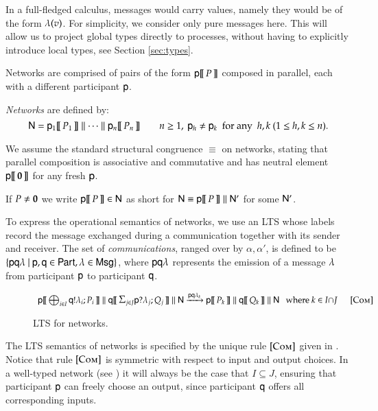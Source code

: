  
In a full-fledged calculus, messages would carry values, 
namely they would be of the form $\lambda(v)$.  For simplicity, we
consider only pure messages here. This will allow us to project global
types directly to processes,  without having to explicitly introduce local
types,  see Section \ref{sec:types}.

\bigskip

Networks are comprised of 
pairs of the form
${\sf p}[\![\,P\,]\!]$ composed in parallel, each with a
different participant ${\sf p}$. 
\begin{definition}[Networks]
{\em Networks} are defined by:
\[
\Nt = \pP{\pp_1}{\PP_1} \parN \cdots \parN \pP{\pp_n}{\PP_n}  \qquad
 n\geq 1,  \ 
\pp_h \neq \pp_k ~~\text{for any}~~ h, k~(1\leq h,k\leq n).
\]
\end{definition}
We assume the standard structural congruence  $\equiv$  on
networks, stating that parallel composition is associative and
commutative and has neutral element ${\sf p}[\![\,\mathbf{0}\,]\!]$ for any fresh
${\sf p}$.

If $P\neq\mathbf{0}$ we write ${\sf p}[\![\,P\,]\!]\in{\sf N}$ as short for
${\sf N}\equiv{\sf p}[\![\,P\,]\!]\mathrel{\|}{\sf N}'$ for some ${\sf N}'$.  



To express the operational semantics of networks, we use an LTS whose
labels record the message exchanged during a communication together
with its sender and receiver.  The set of \emph{communications},
ranged over by $\alpha, \alpha'$, is defined to be $\{
{\sf p}{\sf q}\lambda ~|~ {\sf p},{\sf q}\in {\sf Part}, \lambda \in {\sf Msg}\}$,
where ${\sf p}{\sf q}\lambda$ represents the emission of a message $\lambda$
from participant ${\sf p}$ to participant
${\sf q}$.  %

\begin{figure}[h]
{\small
\[
\begin{array}{c}
\pP{\pp}{\oup\q{i}{I}{\la}{\PP}}\parN \pP{\q}{\inp\pp{j}{J}{\la}{\Q}}\parN\Nt\stackred{\Comm\pp{\la_k}\q}
  \pP{\pp}{\PP_k}\parN \pP{\q}{\Q_k}\parN\Nt~~~\text{where }
   k \in I{\cap}J{~~~~~~\rulename{Com}}
\end{array}
\]
}
\caption{
LTS for networks.}
\end{figure}


The LTS semantics of networks is specified by the unique rule
${[\textsc{Com}]}$ given in .  
Notice that rule
${[\textsc{Com}]}$  is symmetric with respect to 
input and output
choices.  In a well-typed network (see ) it
will always be the case that $I\subseteq J$,  ensuring  that participant
${\sf p}$ can freely choose an output, since participant ${\sf q}$ offers all
corresponding inputs. 

